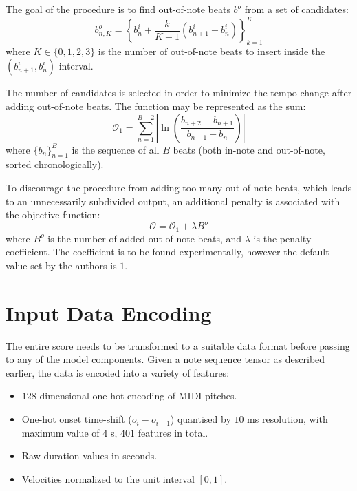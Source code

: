 The goal of the procedure is to find out-of-note beats $b^o$ from a set of candidates: \begin{equation}\label{out_of_note_candidates}
b_{n,K}^o = \left\{b_n^i + \frac{k}{K+1}\left(b_{n+1}^i-b_n^i\right)\right\}_{k=1}^K
\end{equation} where $K\in\{0,1,2,3\}$ is the number of out-of-note beats to insert inside the $\left(b_{n+1}^i, b_n^i\right)$ interval.

The number of candidates is selected in order to minimize the tempo change after adding out-of-note beats. The function may be represented as the sum: \[\mathcal{O}_1 = \sum_{n=1}^{B-2}\left|\ln\left(\frac{b_{n+2} - b_{n+1}}{b_{n+1} - b_n}\right)\right|\] where $\{b_n\}_{n=1}^B$ is the sequence of all $B$ beats (both in-note and out-of-note, sorted chronologically).

To discourage the procedure from adding too many out-of-note beats, which leads to an unnecessarily subdivided output, an additional penalty is associated with the objective function: \begin{equation}\label{out_of_note_objective}
\mathcal{O} = \mathcal{O}_1 + \lambda B^o
\end{equation} where $B^o$ is the number of added out-of-note beats, and $\lambda$ is the penalty coefficient. The coefficient is to be found experimentally, however the default value set by the authors is $1$.



\section{Input Data Encoding}

The entire score needs to be transformed to a suitable data format before passing to any of the model components. Given a note sequence tensor as described earlier, the data is encoded into a variety of features: \begin{itemize}
	\item $128$-dimensional one-hot encoding of MIDI pitches.
	\item One-hot onset time-shift ($o_i - o_{i-1}$) quantised by $10$ ms resolution, with maximum value of $4$ s, $401$ features in total.
	\item Raw duration values in seconds.
	\item Velocities normalized to the unit interval $[0, 1]$.
\end{itemize}

